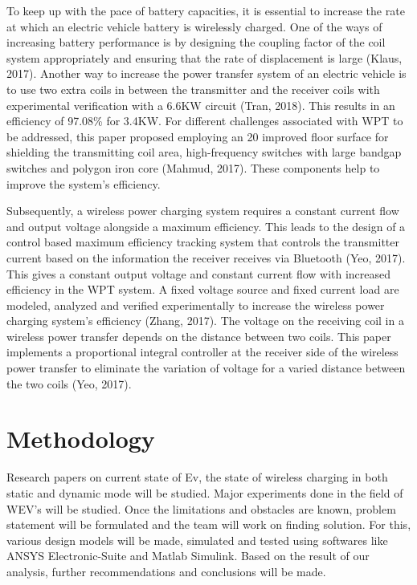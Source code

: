 \documentclass[12pt]{article}
\begin{document}
To keep up with the pace of battery capacities, it is essential to increase the rate at which an
electric vehicle battery is wirelessly charged. One of the ways of increasing battery performance is
by designing the coupling factor of the coil system appropriately and ensuring that the rate of
displacement is large (Klaus, 2017). Another way to increase the power transfer system of an electric
vehicle is to use two extra coils in between the transmitter and the receiver coils with experimental
verification with a 6.6KW circuit (Tran, 2018). This results in an efficiency of 97.08\% for 3.4KW.
For different challenges associated with WPT to be addressed, this paper proposed employing an
20 improved floor surface for shielding the transmitting coil area, high-frequency switches with large
bandgap switches and polygon iron core (Mahmud, 2017). These components help to improve the
system's efficiency.

Subsequently, a wireless power charging system requires a constant current flow and output
voltage alongside a maximum efficiency. This leads to the design of a control based maximum
efficiency tracking system that controls the transmitter current based on the information the receiver
receives via Bluetooth (Yeo, 2017). This gives a constant output voltage and constant current flow
with increased efficiency in the WPT system. A fixed voltage source and fixed current load are
modeled, analyzed and verified experimentally to increase the wireless power charging system's 
efficiency (Zhang, 2017). The voltage on the receiving coil in a wireless power transfer depends on the
distance between two coils. This paper implements a proportional integral controller at the receiver
side of the wireless power transfer to eliminate the variation of voltage for a varied distance between
the two coils (Yeo, 2017). \cite{a2019}


\section{Methodology}
Research papers on current state of Ev, the state of wireless charging in both static and dynamic mode will be studied. Major experiments done in the field of WEV's will be studied. Once the limitations and obstacles are known, problem statement will be formulated and the team will work on finding solution. For this, various design models will be made, simulated and tested using softwares like ANSYS Electronic-Suite and Matlab Simulink. Based on the result of our analysis, further recommendations and conclusions will be made. 
\end{document}
